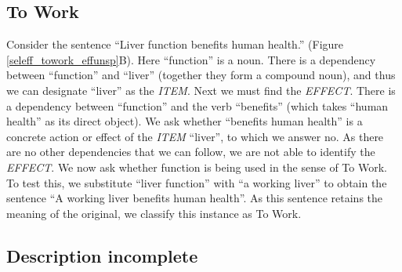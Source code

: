 \documentclass{article}
\begin{document}
\subsection{To Work}
\label{sec:work}

Consider the sentence ``Liver function benefits human health.'' (Figure \ref{seleff_towork_effunsp}B).
Here ``function'' is a noun.
There is a dependency between ``function'' and ``liver'' (together they form a compound noun), and thus we can designate ``liver'' as the \emph{ITEM}.
Next we must find the \emph{EFFECT}.
There is a dependency between ``function'' and the verb ``benefits'' (which takes ``human health'' as its direct object).
We ask whether ``benefits human health'' is a concrete action or effect of the \emph{ITEM} ``liver'', to which we answer no.
As there are no other dependencies that we can follow, we are not able to identify the \emph{EFFECT}.
We now ask whether function is being used in the sense of To Work.
To test this, we substitute ``liver function'' with ``a working liver'' to obtain the sentence ``A working liver benefits human health''.
As this sentence retains the meaning of the original, we classify this instance as To Work.

\subsection{Description incomplete}
\label{sec:descr-incompl}
\end{document}
